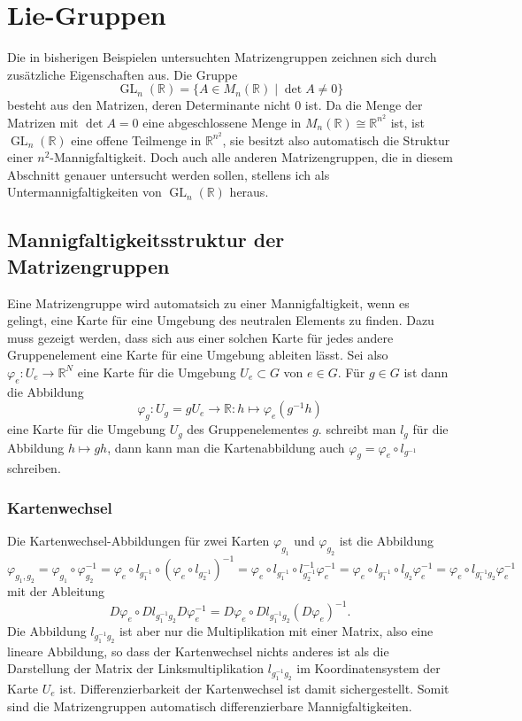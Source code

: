 %
%
%
\section{Lie-Gruppen
\label{buch:section:lie-gruppen}}
Die in bisherigen Beispielen untersuchten Matrizengruppen zeichnen sich
durch zusätzliche Eigenschaften aus.
Die Gruppe
\[
\operatorname{GL}_n(\mathbb{R}) 
=
\{ A \in M_n(\mathbb{R})\;|\; \det A \ne 0\}
\]
besteht aus den Matrizen, deren Determinante nicht $0$ ist.
Da die Menge der Matrizen mit $\det A=0$ eine abgeschlossene Menge
in $M_n(\mathbb{R}) \cong \mathbb{R}^{n^2}$ ist, ist
$\operatorname{GL}_n(\mathbb{R})$ eine offene Teilmenge in $\mathbb{R}^{n^2}$,
sie besitzt also automatisch die Struktur einer $n^2$-Mannigfaltigkeit.
Doch auch alle anderen Matrizengruppen,
die in diesem Abschnitt genauer untersucht werden sollen,
stellens ich als Untermannigfaltigkeiten von
$\operatorname{GL}_n(\mathbb{R})$ heraus.

\subsection{Mannigfaltigkeitsstruktur der Matrizengruppen
\label{buch:subsection:mannigfaltigkeitsstruktur-der-matrizengruppen}}
Eine Matrizengruppe wird automatsich zu einer Mannigfaltigkeit,
wenn es gelingt, eine Karte für eine Umgebung des neutralen Elements
zu finden.
Dazu muss gezeigt werden, dass sich aus einer solchen Karte für jedes
andere Gruppenelement eine Karte für eine Umgebung ableiten lässt.
Sei also $\varphi_e\colon U_e \to \mathbb{R}^N$ eine Karte für die Umgebung
$U_e\subset G$ von $e\in G$.
Für $g\in G$ ist dann die Abbildung
\[
\varphi_g
\colon
U_g
=
gU_e
\to
\mathbb{R}
:
h\mapsto \varphi_e(g^{-1}h)
\]
eine Karte für die Umgebung $U_g$ des Gruppenelementes $g$.
schreibt man $l_{g}$ für  die Abbildung $h\mapsto gh$, dann
kann man die Kartenabbildung auch $\varphi_g = \varphi_e\circ l_{g^{-1}}$
schreiben.

\subsubsection{Kartenwechsel}
Die Kartenwechsel-Abbildungen für zwei Karten $\varphi_{g_1}$
und $\varphi_{g_2}$ ist die Abbildung
\[
\varphi_{g_1,g_2}
=
\varphi_{g_1}\circ \varphi_{g_2}^{-1}
=
\varphi_e\circ l_{g_1^{-1}} \circ (\varphi_e\circ l_{g_2^{-1}})^{-1}
=
\varphi_e\circ l_{g_1^{-1}} \circ l_{g_2^{-1}}^{-1} \varphi_e^{-1}
=
\varphi_e\circ l_{g_1^{-1}} \circ l_{g_2}\varphi_e^{-1}
=
\varphi_e\circ l_{g_1^{-1}g_2}\varphi_e^{-1}
\]
mit der Ableitung
\[
D\varphi_e\circ Dl_{g_1^{-1}g_2} D\varphi_e^{-1}
=
D\varphi_e\circ Dl_{g_1^{-1}g_2} (D\varphi_e)^{-1}.
\]
Die Abbildung $l_{g_1^{-1}g_2}$ ist aber nur die Multiplikation mit
einer Matrix, also eine lineare Abbildung, so dass der Kartenwechsel
nichts anderes ist als die Darstellung der Matrix der Linksmultiplikation
$l_{g_1^{-1}g_2}$ im Koordinatensystem der Karte $U_e$ ist.
Differenzierbarkeit der Kartenwechsel ist damit sichergestellt.
Somit sind
die Matrizengruppen automatisch differenzierbare Mannigfaltigkeiten.


